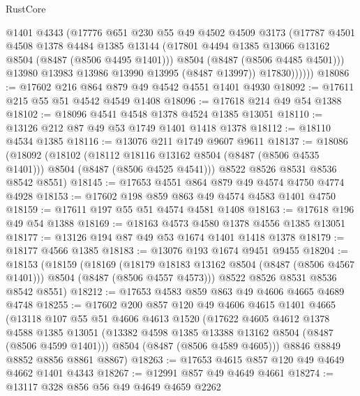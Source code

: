 \begin{lexlean}{RustCore}
\begin{coremodule}
                @1401
                @4343
                (@17776
                  @651
                  @230
                  @55
                  @49
                  @4502
                  @4509
                  @3173
                  (@17787
                    @4501
                    @4508
                    @1378
                    @4484
                    @1385
                    @13144
                    (@17801 @4494 @1385 @13066 @13162 @8504 (@8487 (@8506 @4495 @1401)))
                    @8504
                    (@8487 (@8506 @4485 @4501)))
                  @13980
                  @13983
                  @13986
                  @13990
                  @13995
                  (@8487 @13997))
                @17830))))))
@18086 := @17602 @216 @864 @879 @49 @4542 @4551 @1401 @4930
@18092 := @17611 @215 @55 @51 @4542 @4549 @1408
@18096 := @17618 @214 @49 @54 @1388
@18102 := @18096 @4541 @4548 @1378 @4524 @1385 @13051
@18110 := @13126 @212 @87 @49 @53 @1749 @1401 @1418 @1378
@18112 := @18110 @4534 @1385
@18116 := @13076 @211 @1749 @9607 @9611
@18137 := @18086
    (@18092
      (@18102
        (@18112 @18116 @13162 @8504 (@8487 (@8506 @4535 @1401)))
        @8504
        (@8487 (@8506 @4525 @4541)))
      @8522
      @8526
      @8531
      @8536
      @8542
      @8551)
@18145 := @17653 @4551 @864 @879 @49 @4574 @4750 @4774 @4928
@18153 := @17602 @198 @859 @863 @49 @4574 @4583 @1401 @4750
@18159 := @17611 @197 @55 @51 @4574 @4581 @1408
@18163 := @17618 @196 @49 @54 @1388
@18169 := @18163 @4573 @4580 @1378 @4556 @1385 @13051
@18177 := @13126 @194 @87 @49 @53 @1674 @1401 @1418 @1378
@18179 := @18177 @4566 @1385
@18183 := @13076 @193 @1674 @9451 @9455
@18204 := @18153
    (@18159
      (@18169
        (@18179 @18183 @13162 @8504 (@8487 (@8506 @4567 @1401)))
        @8504
        (@8487 (@8506 @4557 @4573)))
      @8522
      @8526
      @8531
      @8536
      @8542
      @8551)
@18212 := @17653 @4583 @859 @863 @49 @4606 @4665 @4689 @4748
@18255 := @17602
    @200
    @857
    @120
    @49
    @4606
    @4615
    @1401
    @4665
    (@13118
      @107
      @55
      @51
      @4606
      @4613
      @1520
      (@17622
        @4605
        @4612
        @1378
        @4588
        @1385
        @13051
        (@13382 @4598 @1385 @13388 @13162 @8504 (@8487 (@8506 @4599 @1401)))
        @8504
        (@8487 (@8506 @4589 @4605)))
      @8846
      @8849
      @8852
      @8856
      @8861
      @8867)
@18263 := @17653 @4615 @857 @120 @49 @4649 @4662 @1401 @4343
@18267 := @12991 @857 @49 @4649 @4661
@18274 := @13117 @328 @856 @56 @49 @4649 @4659 @2262

\end{coremodule}
\end{lexlean}
